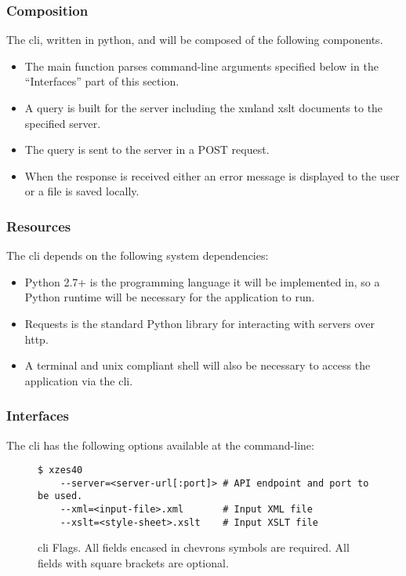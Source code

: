 \subsubsection{Composition}

The \gls{cli}, written in \gls{python}, and will be composed of the following components.

\begin{itemize}
	\item The main function parses command-line arguments specified below in the ``Interfaces'' part of this section.
    \item A query is built for the server including the \gls{xml}and \gls{xslt} documents to the specified server.
    \item The query is sent to the server in a POST request.
    \item When the response is received either an error message is displayed to the user or a file is saved locally.
\end{itemize}

\subsubsection{Resources}

The \gls{cli} depends on the following system dependencies:

\begin{itemize}
	\item {Python 2.7+} is the programming language it will be implemented in, so a Python runtime will be necessary for the application to run.
    \item {Requests} is the standard Python library for interacting with servers over \gls{http}.
    \item {A terminal and \gls{unix} compliant shell} will also be necessary to access the application via the \gls{cli}.
\end{itemize}

\subsubsection{Interfaces}

The \gls{cli} has the following options available at the command-line:
\begin{figure}
    \begin{lstlisting}
$ xzes40
    --server=<server-url[:port]> # API endpoint and port to be used.
    --xml=<input-file>.xml       # Input XML file
    --xslt=<style-sheet>.xslt    # Input XSLT file
    \end{lstlisting}
    \caption{\gls{cli} Flags. All fields encased in chevrons symbols are required. All fields with square brackets are optional.}
\end{figure}

